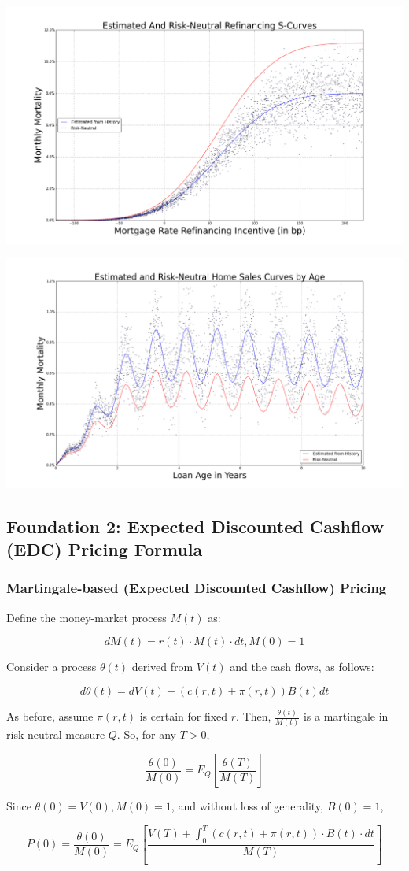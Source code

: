 \documentclass{beamer}
\begin{document}
\begin{frame}
\includegraphics[scale=0.27]{risk_neutral_scurve.png}
\end{frame}

\begin{frame}
\includegraphics[scale=0.26]{risk_neutral_relo.png}
\end{frame}



\subsection{Foundation 2: Expected Discounted Cashflow (EDC) Pricing Formula}

\begin{frame}
\frametitle{Martingale-based (Expected Discounted Cashflow) Pricing}
Define the money-market process $M(t)$ as:

$$dM(t) = r(t) \cdot M(t) \cdot dt, M(0) = 1$$

Consider a process $\theta(t)$ derived from $V(t)$ and the cash flows, as follows:

$$d\theta(t) = dV(t) + (c(r,t) + \pi(r,t)) B(t) dt$$

As before, assume $\pi(r,t)$ is certain for fixed $r$. Then, $\frac {\theta(t)} {M(t)}$ is a martingale in risk-neutral measure $Q$. So, for any $T > 0$,

$$\frac {\theta(0)} {M(0)} = E_Q[\frac {\theta(T)} {M(T)}]$$

Since $\theta(0) = V(0), M(0) = 1$, and without loss of generality, $B(0) = 1$,

$$P(0) = \frac {\theta(0)} {M(0)} = E_Q[\frac {V(T) + \int_0^T (c(r,t) + \pi(r,t))\cdot B(t) \cdot dt} {M(T)}]$$

\end{frame}
\end{document}
